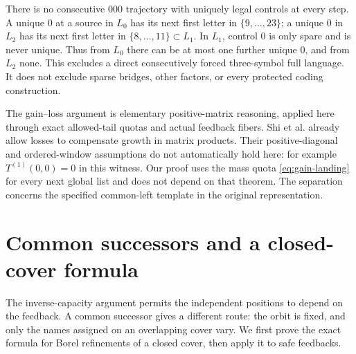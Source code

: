 \documentclass[11pt,reqno]{amsart}
\numberwithin{equation}{section}
\theoremstyle{definition}
\begin{document}
There is no consecutive $000$ trajectory with uniquely legal
controls at every step. A unique $0$ at a source in $L_0$ has its
next first letter in $\{9,\ldots,23\}$; a unique $0$ in $L_2$
has its next first letter in $\{8,\ldots,11\}\subset L_1$.
In $L_1$, control $0$ is only spare and is never unique.
Thus from $L_0$ there can be at most one further unique $0$,
and from $L_2$ none. This excludes a direct consecutively forced
three-symbol full language. It does not exclude sparse bridges,
other factors, or every protected coding construction.

The gain--loss argument is elementary positive-matrix reasoning,
applied here through exact allowed-tail quotas and actual feedback
fibers. Shi et al. \cite[Definition~2.5 and Theorems~2.6, 2.8,
pp.~8--11 of arXiv:2004.01867v2]{Shi2021}
already allow losses to compensate growth in matrix products.
Their positive-diagonal and ordered-window assumptions do not
automatically hold here: for example $T^{(1)}(0,0)=0$ in this
witness. Our proof uses the mass quota
\eqref{eq:gain-landing} for every next global list and does not
depend on that theorem. The separation concerns the specified common-left template in the
original representation.


\section{Common successors and a closed-cover formula}\label{sec:closed-cover}

The inverse-capacity argument permits the independent positions to
depend on the feedback. A common successor gives a different route:
the orbit is fixed, and only the names assigned on an overlapping
cover vary. We first prove the exact formula for Borel refinements
of a closed cover, then apply it to safe feedbacks.
\end{document}
